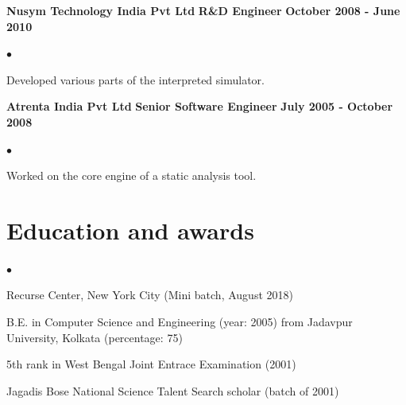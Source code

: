 \documentclass[margin,line]{res}
\newenvironment{list1}{
  \begin{list}{$\bullet$}{%
      \setlength{\itemsep}{0in}
      \setlength{\parsep}{0in} \setlength{\parskip}{0in}
      \setlength{\topsep}{0in} \setlength{\partopsep}{0in}
      \setlength{\leftmargin}{0.17in}}}{\end{list}}
\begin{document}
\begin{resume}
{\bf  Nusym Technology India Pvt Ltd}
\hfill {\bf R\&D Engineer}
\hfill{\bf October 2008 - June 2010}
\vspace{.05in}
\begin{list1} %
	\item Developed various parts of the interpreted simulator.
\end{list1}
{\bf  Atrenta India Pvt Ltd}
\hfill {\bf Senior Software Engineer}
\hfill{\bf July 2005 - October 2008}
\vspace{.05in}
\begin{list1} %
\item Worked on the core engine of a static analysis tool.
\end{list1}

\section{\sc Education and awards}
\begin{list1}
	\item Recurse Center, New York City (Mini batch, August 2018)
	\item B.E. in Computer Science and Engineering (year: 2005)
from Jadavpur University, Kolkata (percentage: 75)
	\item 5th rank in West Bengal Joint Entrace Examination (2001)
	\item Jagadis Bose National Science Talent Search scholar (batch of 2001)
\end{list1}

\end{resume}
\end{document}
